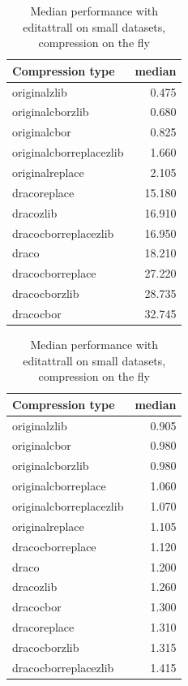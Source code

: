  \begin{table}[!h]
    \begin{minipage}{.5\linewidth}
      \caption{
Median performance with editattrall on large datasets, compression on the fly}
\centering

\begin{tabular}{|l|r|}
\hline
Compression type & median\\
\hline
originalzlib & 0.475\\
\hline
originalcborzlib & 0.680\\
\hline
originalcbor & 0.825\\
\hline
originalcborreplacezlib & 1.660\\
\hline
originalreplace & 2.105\\
\hline
dracoreplace & 15.180\\
\hline
dracozlib & 16.910\\
\hline
dracocborreplacezlib & 16.950\\
\hline
draco & 18.210\\
\hline
dracocborreplace & 27.220\\
\hline
dracocborzlib & 28.735\\
\hline
dracocbor & 32.745\\
\hline
\end{tabular}
\end{minipage}%
    \begin{minipage}{.5\linewidth}
      \centering
        \caption{
Median performance with editattrall on small datasets, compression on the fly}

\begin{tabular}{|l|r|}
\hline
Compression type & median\\
\hline
originalzlib & 0.905\\
\hline
originalcbor & 0.980\\
\hline
originalcborzlib & 0.980\\
\hline
originalcborreplace & 1.060\\
\hline
originalcborreplacezlib & 1.070\\
\hline
originalreplace & 1.105\\
\hline
dracocborreplace & 1.120\\
\hline
draco & 1.200\\
\hline
dracozlib & 1.260\\
\hline
dracocbor & 1.300\\
\hline
dracoreplace & 1.310\\
\hline
dracocborzlib & 1.315\\
\hline
dracocborreplacezlib & 1.415\\
\hline
\end{tabular}
\end{minipage} 
\end{table}

